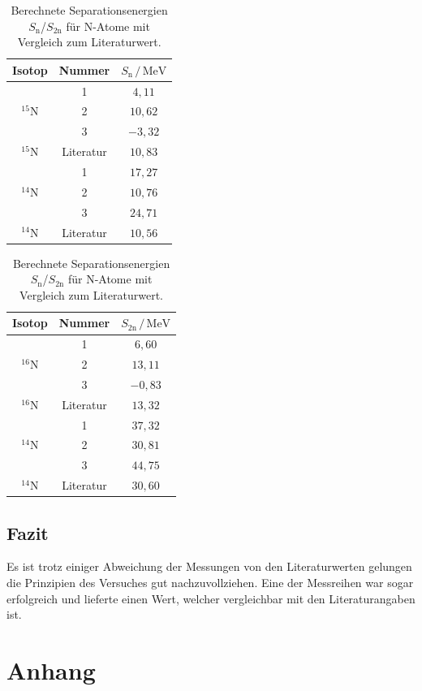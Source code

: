 \documentclass[numbers=noenddot,a4paper,notitlepage,twoside,BCOR15mm]{scrartcl}
\begin{document}
				\begin{table}[h]
					\centering
					\caption{Berechnete Separationsenergien $S_\mathrm{n}$/$S_\mathrm{2n}$ für N-Atome mit Vergleich zum Literaturwert.}
					\begin{tabular}{c c|c} 
						Isotop & Nummer & $S_\mathrm{n}\,/\,\mathrm{MeV}$ \\ \hline
							     & 1 & $4,11$ \\
						$^{15}$N & 2 & $10,62$ \\
								 & 3 & $-3,32$ \\ \hline
						$^{15}$N & Literatur & $10,83$ \\ \hline
								 & 1 & $17,27$ \\
				 		$^{14}$N & 2 & $10,76$ \\
				 				 & 3 & $24,71$ \\ \hline
						$^{14}$N & Literatur & $10,56$ \\ \hline
					\end{tabular}
					\quad
					\begin{tabular}{c c|c} 
						Isotop & Nummer & $S_\mathrm{2n}\,/\,\mathrm{MeV}$ \\ \hline
								 & 1 & $6,60$ \\
						$^{16}$N & 2 & $13,11$ \\
								 & 3 & $-0,83$ \\ \hline
						$^{16}$N & Literatur & $13,32$ \\ \hline
								 & 1 & $37,32$ \\
						$^{14}$N & 2 & $30,81$ \\
								 & 3 & $44,75$ \\ \hline
						$^{14}$N & Literatur & $30,60$ \\ \hline
						\end{tabular}
					\label{tab:sep}
				\end{table}
				
				\subsection{Fazit}
			
			Es ist trotz einiger Abweichung der Messungen von den Literaturwerten gelungen die Prinzipien des Versuches gut nachzuvollziehen. Eine der Messreihen war sogar erfolgreich und lieferte einen Wert, welcher vergleichbar mit den Literaturangaben ist.
				
	\newpage
	\section{Anhang}
\end{document}
